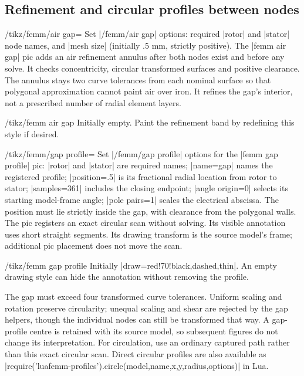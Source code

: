 \subsection{Refinement and circular profiles between nodes}
\begin{key}{/tikz/femm/air gap=}
Set |/femm/air gap| options: required |rotor| and |stator| node names, and
|mesh size| (initially .5 mm, strictly positive). The |femm air gap| pic adds
an air refinement annulus after both nodes exist and before any solve.
It checks concentricity, circular transformed surfaces and positive clearance.
The annulus stays two curve tolerances from each nominal surface so that
polygonal approximation cannot paint air over iron. It refines the gap's
interior, not a prescribed number of radial element layers.
\end{key}
\begin{stylekey}{/tikz/femm air gap}
Initially empty. Paint the refinement band by redefining this style if desired.
\end{stylekey}
\begin{key}{/tikz/femm/gap profile=}
Set |/femm/gap profile| options for the |femm gap profile| pic:
|rotor| and |stator| are required names; |name=gap| names the registered
profile; |position=.5| is its fractional radial location from rotor to stator;
|samples=361| includes the closing endpoint; |angle origin=0| selects its
starting model-frame angle; |pole pairs=1| scales the electrical abscissa.
The position must lie strictly inside the gap, with clearance from the
polygonal walls. The pic registers an exact circular scan without solving.
Its visible annotation uses short straight segments. Its drawing transform is
the source model's frame; additional pic placement does not move the scan.
\end{key}
\begin{stylekey}{/tikz/femm gap profile}
Initially |draw=red!70!black,dashed,thin|. An empty drawing style can hide the
annotation without removing the profile.
\end{stylekey}

The gap must exceed four transformed curve tolerances. Uniform scaling and
rotation preserve circularity; unequal scaling and shear are rejected by the
gap helpers, though the individual nodes can still be transformed that way.
A gap-profile centre is retained with its source model, so subsequent figures
do not change its interpretation. For circulation, use an ordinary captured path rather than this exact circular
scan. Direct circular profiles are also available
as |require('luafemm-profiles').circle(model,name,x,y,radius,options)| in Lua.

